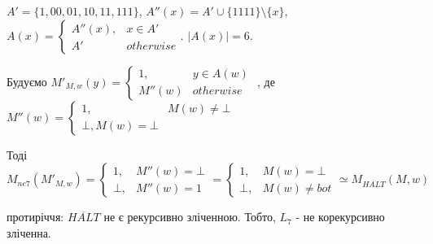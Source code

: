 \documentclass[11pt, a4paper]{article} %
\begin{document}
$A' = \{1,00,01,10,11,111\}$,
$A''(x) = A' \cup \{1111\} \setminus \{x\}$,
$A(x) = \begin{cases}
    A''(x), & x \in A'\\
    A' & otherwise
\end{cases}$. $|A(x)| = 6$.


Будуємо $M'_{M,w}(y) = \begin{cases}
    1, & y \in A(w) \\
    M''(w) & otherwise
\end{cases}$
, де $M''(w) = \begin{cases}
    1, & M(w) \ne \bot\\
    \bot, M(w) = \bot
\end{cases}$

Тоді 
$$M_{ne7}(M'_{M,w}) = \begin{cases}
    1, & M''(w) = \bot\\
    \bot, & M''(w) = 1
\end{cases} = \begin{cases}
    1, & M(w) = \bot\\
    \bot, & M(w) \ne bot
\end{cases} \simeq M_{\overline{HALT}}(M,w)$$

протиріччя: $\overline{HALT}$ не є рекурсивно зліченною.
Тобто, $L_7$ - не корекурсивно зліченна.
\end{document}
